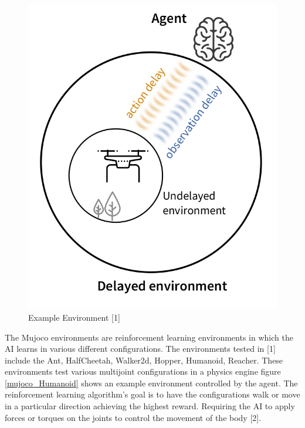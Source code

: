 \documentclass{article} %
\begin{document}
\begin{figure}[H]
\begin{center}
\includegraphics[scale=0.18]{images/fig1FromPaper}
\end{center}
\caption{Example Environment [1]}
\label{environmentImage}
\end{figure}

The Mujoco environments are reinforcement learning environments in which the AI learns in
various different configurations. 
The environments tested in [1] include the Ant, HalfCheetah, Walker2d, Hopper, Humanoid,
Reacher. 
These environments test various multijoint configurations in a physics engine figure \ref{mujoco_Humanoid} 
shows an example environment controlled by the agent.
The reinforcement learning algorithm's goal is to have the configurations walk or move in a 
particular direction achieving the highest reward. 
Requiring the AI to apply forces or torques on the joints to control the movement of the body 
[2].
\end{document}
